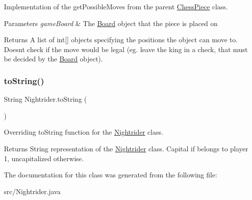 Implementation of the get\+Possible\+Moves from the parent \mbox{\hyperlink{class_chess_piece}{Chess\+Piece}} class. 
\begin{DoxyParams}{Parameters}
{\em game\+Board} & The \mbox{\hyperlink{class_board}{Board}} object that the piece is placed on \\
\hline
\end{DoxyParams}
\begin{DoxyReturn}{Returns}
A list of int\mbox{[}\mbox{]} objects specifying the positions the object can move to. Doesn\textquotesingle{}t check if the move would be legal (eg. leave the king in a check, that must be decided by the \mbox{\hyperlink{class_board}{Board}} object). 
\end{DoxyReturn}
\mbox{\label{class_nightrider_a0ff693c0576916c80f08f4d060b1867d}} 
\subsubsection{\texorpdfstring{to\+String()}{toString()}}
{\footnotesize\ttfamily String Nightrider.\+to\+String (\begin{DoxyParamCaption}{ }\end{DoxyParamCaption})}

Overriding to\+String function for the \mbox{\hyperlink{class_nightrider}{Nightrider}} class. \begin{DoxyReturn}{Returns}
String representation of the \mbox{\hyperlink{class_nightrider}{Nightrider}} class. Capital if belongs to player 1, uncapitalized otherwise. 
\end{DoxyReturn}


The documentation for this class was generated from the following file\+:\begin{DoxyCompactItemize}
\item 
src/Nightrider.\+java\end{DoxyCompactItemize}
